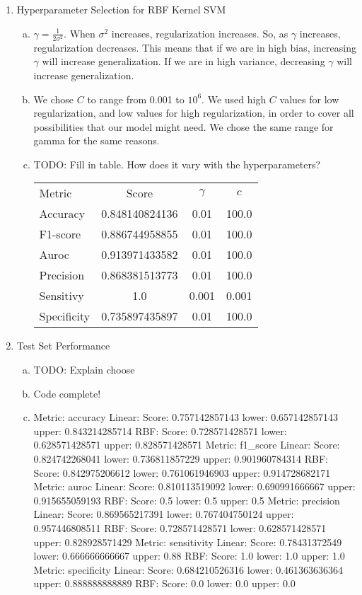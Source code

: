 \documentclass[11pt]{article}
\begin{document}
\begin{enumerate}[(2)]
\begin{enumerate}[(b)]
\end{enumerate}
\item Hyperparameter Selection for RBF Kernel SVM
\begin{enumerate}[(a)]
\item $\gamma = \frac{1}{2\sigma^2}$. When $\sigma^2$ increases, regularization increases. So, as $\gamma$
increases, regularization decreases. This means that if we are in high bias, increasing $\gamma$ will 
increase generalization. If we are in high variance, decreasing $\gamma$ will increase generalization. 
\item We chose $C$ to range from 0.001 to $10^6$. We used high $C$ values for low regularization, and 
low values for high regularization, in order to cover all possibilities that our model might need. We chose
the same range for gamma for the same reasons. 
\item TODO: Fill in table. How does it vary with the hyperparameters?

\begin{tabular}{| l | c | c | c |}
\hline
Metric & Score & $\gamma$ & $c$ \\
Accuracy & 0.848140824136 & 0.01 & 100.0 \\
F1-score & 0.886744958855 & 0.01 & 100.0 \\
Auroc & 0.913971433582 & 0.01 & 100.0 \\
Precision & 0.868381513773 & 0.01 & 100.0 \\
Sensitivy & 1.0 & 0.001 & 0.001 \\
Specificity & 0.735897435897 & 0.01 & 100.0 \\
\hline
\end{tabular}
\end{enumerate}
\item Test Set Performance
\begin{enumerate}[(a)]
\item TODO: Explain choose
\item Code complete!
\item Metric: accuracy
Linear: Score: 0.757142857143 lower: 0.657142857143 upper: 0.843214285714
RBF: Score: 0.728571428571 lower: 0.628571428571 upper: 0.828571428571
Metric: f1\_score
Linear: Score: 0.824742268041 lower: 0.736811857229 upper: 0.901960784314
RBF: Score: 0.842975206612 lower: 0.761061946903 upper: 0.914728682171
Metric: auroc
Linear: Score: 0.810113519092 lower: 0.690991666667 upper: 0.915655059193
RBF: Score: 0.5 lower: 0.5 upper: 0.5
Metric: precision
Linear: Score: 0.869565217391 lower: 0.767404750124 upper: 0.957446808511
RBF: Score: 0.728571428571 lower: 0.628571428571 upper: 0.828928571429
Metric: sensitivity
Linear: Score: 0.78431372549 lower: 0.666666666667 upper: 0.88
RBF: Score: 1.0 lower: 1.0 upper: 1.0
Metric: specificity
Linear: Score: 0.684210526316 lower: 0.461363636364 upper: 0.888888888889
RBF: Score: 0.0 lower: 0.0 upper: 0.0
\end{enumerate}
\end{enumerate}
\end{document}
